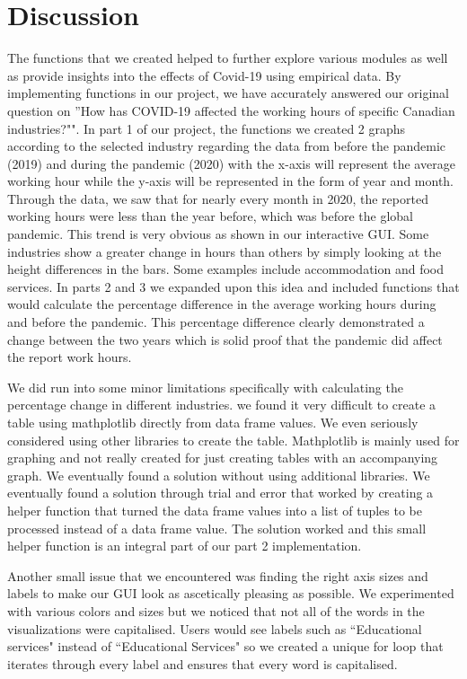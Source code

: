 \documentclass[fontsize=11pt]{article}
\begin{document}
\section*{Discussion} 

The functions that we created helped to further explore various modules as well as provide insights into the effects of Covid-19 using empirical data. By implementing functions in our project, we have accurately answered our original question on ''How has COVID-19 affected the working hours of specific Canadian industries?"". In part 1 of our project, the functions we created 2 graphs according to the selected industry regarding the data
from before the pandemic (2019) and during the pandemic (2020) with the x-axis will represent the average working hour while the y-axis
will be represented in the form of year and month. Through the data, we saw that for nearly every month in 2020, the reported working hours were less than the year before, which was before the global pandemic. This trend is very obvious as shown in our interactive GUI. Some industries show a greater change in hours than others by simply looking at the height differences in the bars. Some examples include accommodation and food services. In parts 2 and 3 we expanded upon this idea and included functions that would calculate the percentage difference in the average working hours during and before the pandemic. This percentage difference clearly demonstrated a change between the two years which is solid proof that the pandemic did affect the report work hours. 


\medskip


We did run into some minor limitations specifically with calculating the percentage change in different industries. we found it very difficult to create a table using mathplotlib directly from data frame values. We even seriously considered using other libraries  to create the table. Mathplotlib is mainly used for graphing and not really created for just creating tables with an accompanying graph. We eventually found a solution without using additional libraries. We eventually found a solution through trial and error that worked by creating a helper function that turned the data frame values into a list of tuples to be processed instead of a data frame value. The solution worked and this small helper function is an integral part of our part 2 implementation.

Another small issue that we encountered was finding the right axis sizes and labels to make our GUI look as ascetically pleasing as possible. We experimented with various colors and sizes but we noticed that not all of the words in the visualizations were capitalised. Users would see labels such as ``Educational services" instead of ``Educational Services" so we created a unique for loop that iterates through every label and ensures that every word is capitalised.
\end{document}
